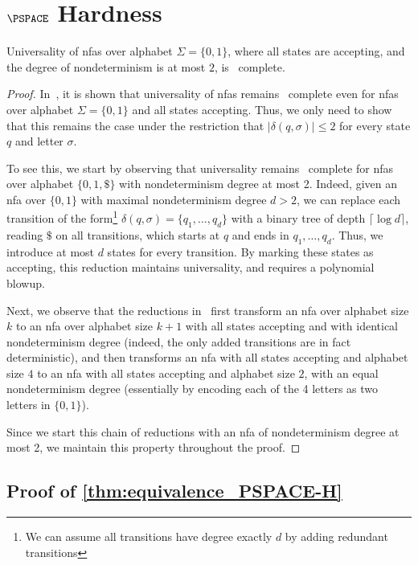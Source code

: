 \chapter{$\PSPACE$ Hardness}
\label{chap:apx}

\begin{lemma}
\label{lem:universalityofnfa}
Universality of \glspl{nfa} over alphabet $\Sigma=\{0,1\}$, where all states are accepting, and the degree of nondeterminism is at most $2$, is \PSPACE\ complete.
\end{lemma}
\begin{proof}
In~\cite{kao2009nfas}, it is shown that universality of \glspl{nfa} remains \PSPACE\ complete even for \glspl{nfa} over alphabet $\Sigma=\{0,1\}$ and all states accepting. Thus, we only need to show that this remains the case under the restriction that $|\delta(q,\sigma)|\le 2$ for every state $q$ and letter $\sigma$.

To see this, we start by observing that universality remains \PSPACE\ complete for \glspl{nfa} over alphabet $\{0,1,\$\}$ with nondeterminism degree at most 2. Indeed, given an \gls{nfa} over $\{0,1\}$ with maximal nondeterminism degree $d>2$, we can replace each transition of the form\footnote{We can assume all transitions have degree exactly $d$ by adding redundant transitions} $\delta(q,\sigma)=\{q_1,\ldots, q_d\}$ with a binary tree of depth $\lceil \log d \rceil$, reading $\$$ on all transitions, which starts at $q$ and ends in $q_1,\ldots,q_d$. Thus, we introduce at most $d$ states for every transition. By marking these states as accepting, this reduction maintains universality, and requires a polynomial blowup.

Next, we observe that the reductions in~\cite[Lemma 2]{kao2009nfas} first transform an \gls{nfa} over alphabet size $k$ to an \gls{nfa} over alphabet size $k+1$ with all states accepting and with identical nondeterminism degree (indeed, the only added transitions are in fact deterministic), and then transforms an \gls{nfa} with all states accepting and alphabet size $4$ to an \gls{nfa} with all states accepting and alphabet size $2$, with an equal nondeterminism degree (essentially by encoding each of the 4 letters as two letters in $\{0,1\}$).

Since we start this chain of reductions with an \gls{nfa} of nondeterminism degree at most 2, we maintain this property throughout the proof.
\end{proof}

\section{Proof of \autoref{thm:equivalence_PSPACE-H}}
\label{apx:proof_equivalence_PSPACE-H}

